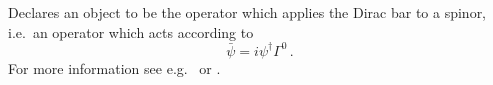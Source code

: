
Declares an object to be the operator which applies the Dirac bar to a
spinor, i.e.~an operator which acts according to
\begin{equation}
\bar{\psi} = i \psi^\dagger \Gamma^0\,.
\end{equation}
For more information see e.g.~ or .

